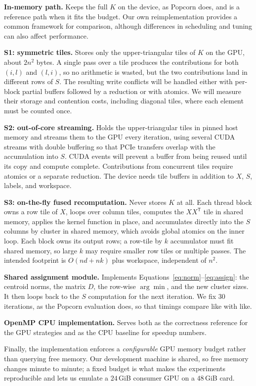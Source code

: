 \documentclass[sigconf]{acmart}
\begin{document}
\textbf{In-memory path.} Keeps the full $K$ on the device, as Popcorn does, and
is a reference path when it fits the budget. Our own reimplementation provides
a common framework for comparison, although differences in scheduling and
tuning can also affect performance.

\textbf{S1: symmetric tiles.} Stores only the upper-triangular tiles of $K$ on
the GPU, about $2n^2$ bytes. A single pass over a tile produces the
contributions for both $(i,l)$ and $(l,i)$, so no arithmetic is wasted, but the
two contributions land in different rows of $S$. The resulting write conflicts
will be handled either with per-block partial buffers followed by a reduction
or with atomics. We will measure their storage and contention costs, including
diagonal tiles, where each element must be counted once.

\textbf{S2: out-of-core streaming.} Holds the upper-triangular tiles in pinned
host memory and streams them to the GPU every iteration, using several CUDA
streams with double buffering so that PCIe transfers overlap with the
accumulation into $S$. CUDA events will prevent a buffer from being reused
until its copy and compute complete. Contributions from concurrent tiles
require atomics or a separate reduction. The device needs tile buffers in
addition to $X$, $S$, labels, and workspace.

\textbf{S3: on-the-fly fused recomputation.} Never stores $K$ at all. Each
thread block owns a row tile of $X$, loops over column tiles, computes the
$X X^{\mathsf{T}}$ tile in shared memory, applies the kernel function in place,
and accumulates directly into the $S$ columns by cluster in shared memory,
which avoids global atomics on the inner loop. Each block owns its output rows;
a row-tile by $k$ accumulator must fit shared memory, so large $k$ may require
smaller row tiles or multiple passes. The intended footprint is $O(nd + nk)$
plus workspace, independent of $n^2$.

\textbf{Shared assignment module.} Implements
Equations~\eqref{eq:norm}--\eqref{eq:assign}: the centroid norms, the matrix
$D$, the row-wise $\arg\min$, and the new cluster sizes. It then loops back to
the $S$ computation for the next iteration. We fix 30 iterations, as the
Popcorn evaluation does, so that timings compare like with like.

\textbf{OpenMP CPU implementation.} Serves both as the correctness reference
for the GPU strategies and as the CPU baseline for speedup numbers.

Finally, the implementation enforces a \emph{configurable} GPU memory budget
rather than querying free memory. Our development machine is shared, so free
memory changes minute to minute; a fixed budget is what makes the experiments
reproducible and lets us emulate a $24$\,GiB consumer GPU on a $48$\,GiB card.
\end{document}
